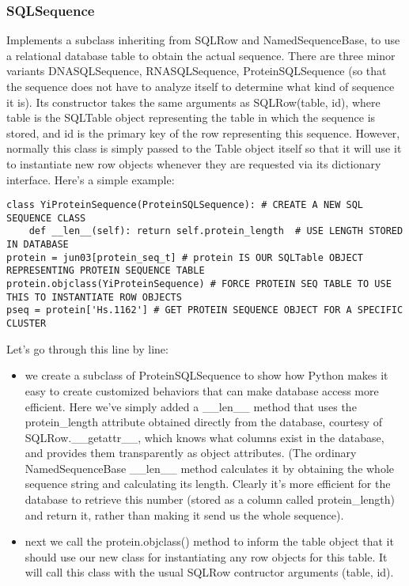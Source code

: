 \documentclass{howto}
\begin{document}
\subsubsection{SQLSequence}

Implements a subclass inheriting from SQLRow and NamedSequenceBase, to use a relational database table to obtain the actual sequence.  There are three minor variants DNASQLSequence, RNASQLSequence, ProteinSQLSequence (so that the sequence does not have to analyze itself to determine what kind of sequence it is).  Its constructor takes the same arguments as SQLRow(table, id), where table is the SQLTable object representing the table in which the sequence is stored, and id is the primary key of the row representing this sequence.  However, normally this class is simply passed to the Table object itself so that it will use it to instantiate new row objects whenever they are requested via its dictionary interface.  Here's a simple example:

\begin{verbatim}
class YiProteinSequence(ProteinSQLSequence): # CREATE A NEW SQL SEQUENCE CLASS
    def __len__(self): return self.protein_length  # USE LENGTH STORED IN DATABASE
protein = jun03[protein_seq_t] # protein IS OUR SQLTable OBJECT REPRESENTING PROTEIN SEQUENCE TABLE
protein.objclass(YiProteinSequence) # FORCE PROTEIN SEQ TABLE TO USE THIS TO INSTANTIATE ROW OBJECTS
pseq = protein['Hs.1162'] # GET PROTEIN SEQUENCE OBJECT FOR A SPECIFIC CLUSTER
\end{verbatim}

Let's go through this line by line:

\begin{itemize}

\item
we create a subclass of ProteinSQLSequence to show how Python makes it easy to create customized behaviors that can make database access more efficient.  Here we've simply added a __len__ method that uses the protein_length attribute obtained directly from the database, courtesy of SQLRow.__getattr__, which knows what columns exist in the database, and provides them transparently as object attributes.  (The ordinary NamedSequenceBase __len__ method calculates it by obtaining the whole sequence string and calculating its length.  Clearly it's more efficient for the database to retrieve this number (stored as a column called protein_length) and return it, rather than making it send us the whole sequence).

\item
next we call the protein.objclass() method to inform the table object that it should use our new class for instantiating any row objects for this table.  It will call this class with the usual SQLRow contructor arguments (table, id).
\end{itemize}
\end{document}
